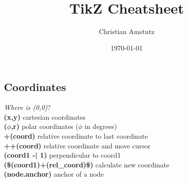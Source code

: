 \documentclass[10pt]{article}
\title{TikZ Cheatsheet}
\author{Christian Amstutz}
\date{\today}
\newcommand{\tikzcmd}[1]{\textbf{#1}}
\begin{document}
    \maketitle

    \begin{multicols}{2}

        \section{Coordinates}
        \emph{Where is (0,0)}?\\
        \tikzcmd{(x,y)} cartesian coordinates\\
        \tikzcmd{($\phi$,r)} polar coordinates ($\phi$ in degrees)\\
        \tikzcmd{+(coord)} relative coordinate to last coordinate\\
        \tikzcmd{++(coord)} relative coordinate and move cursor\\
        \tikzcmd{(coord1 -| 1)} perpendicular to coord1\\
        \tikzcmd{(\$(coord1)+(rel\_coord)\$)} calculate new coordinate \\
        \tikzcmd{(node.anchor)} anchor of a node\\

    \end{multicols}
\end{document}

